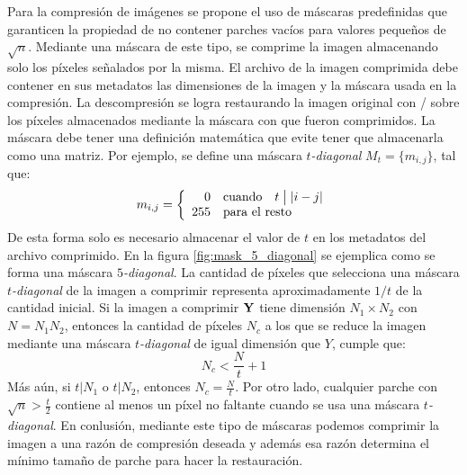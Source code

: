 Para la compresi\'on de im\'agenes se propone el uso de m\'ascaras predefinidas que garanticen la propiedad de no contener parches vac\'ios para valores pequeños de $\sqrt{n}$. Mediante una m\'ascara de este tipo, se comprime la imagen almacenando solo los p\'ixeles señalados por la misma. El archivo de la imagen comprimida debe contener en sus metadatos las dimensiones de la imagen y la m\'ascara usada en la compresi\'on. La descompresi\'on se logra restaurando la imagen original con \SOP/ sobre los p\'ixeles almacenados mediante la m\'ascara con que fueron comprimidos. La m\'ascara debe tener una definici\'on matem\'atica que evite tener que almacenarla como una matriz. Por ejemplo, se define una m\'ascara $t$\textit{-diagonal} $M_t = \{m_{i,j}\}$, tal que:
\begin{equation}
	m_{i, j} = \left\{\begin{array}{rl}
		0 & \mbox{cuando} \quad t \bigm| |i - j|\\
		255 & \mbox{para el resto} \\
	\end{array}\right.
\end{equation}
De esta forma solo es necesario almacenar el valor de $t$ en los metadatos del archivo comprimido. En la figura \ref{fig:mask_5_diagonal} se ejemplica como se forma una m\'ascara $5$\textit{-diagonal}. La cantidad de p\'ixeles que selecciona una m\'ascara $t$\textit{-diagonal} de la imagen a comprimir representa aproximadamente $1/t$ de la cantidad inicial. Si la imagen a comprimir $\mathbf{Y}$ tiene dimensi\'on $N_1 \times N_2$ con $N = N_1N_2$, entonces la cantidad de p\'ixeles $N_c$ a los que se reduce la imagen mediante una m\'ascara $t$\textit{-diagonal} de igual dimensi\'on que $Y$, cumple que:
\begin{equation}
	N_c < \frac{N}{t} + 1
\end{equation}
M\'as a\'un, si $t | N_1$ o $t | N_2$, entonces $N_c = \frac{N}{t}$. Por otro lado, cualquier parche con $\sqrt{n} > \frac{t}{2}$ contiene al menos un p\'ixel no faltante cuando se usa una m\'ascara $t$\textit{-diagonal}. En conlusi\'on, mediante este tipo de m\'ascaras podemos comprimir la imagen a una raz\'on de compresi\'on deseada y adem\'as esa raz\'on determina el m\'inimo tamaño de parche para hacer la restauraci\'on.
